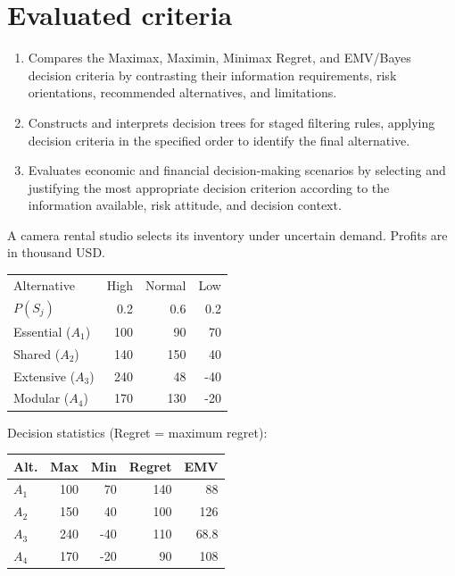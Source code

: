 \section*{Evaluated criteria}
\begin{enumerate}[label=\textbf{C\arabic*},start=8]
\item Compares the Maximax, Maximin, Minimax Regret, and EMV/Bayes decision criteria by contrasting their information requirements, risk orientations, recommended alternatives, and limitations.
\item Constructs and interprets decision trees for staged filtering rules, applying decision criteria in the specified order to identify the final alternative.
\item Evaluates economic and financial decision-making scenarios by selecting and justifying the most appropriate decision criterion according to the information available, risk attitude, and decision context.
\end{enumerate}



A camera rental studio selects its inventory under uncertain demand. Profits are in thousand USD.

\vspace{-3mm}
\begin{center}\small\setlength{\tabcolsep}{4pt}
	\begin{tabular}{lrrr}\toprule
		Alternative & High & Normal & Low\\
		$P(S_j)$ & 0.2 & 0.6 & 0.2\\ \midrule
		Essential ($A_1$) & 100 & 90 & 70\\
		Shared ($A_2$) & 140 & 150 & 40\\
		Extensive ($A_3$) & 240 & 48 & -40\\
		Modular ($A_4$) & 170 & 130 & -20\\
		\bottomrule
	\end{tabular}
\end{center} \vspace*{-3mm}

Decision statistics (Regret = maximum regret):

\vspace{-3mm}
\begin{center}\small\setlength{\tabcolsep}{4pt}
	\begin{tabular}{lrrrr}\toprule
		Alt. & Max & Min & Regret & EMV\\ \midrule
		$A_1$ & 100 & 70 & 140 & 88\\
		$A_2$ & 150 & 40 & 100 & 126\\
		$A_3$ & 240 & -40 & 110 & 68.8\\
		$A_4$ & 170 & -20 & 90 & 108\\
		\bottomrule
	\end{tabular}
\end{center}
\vspace{-3mm}

